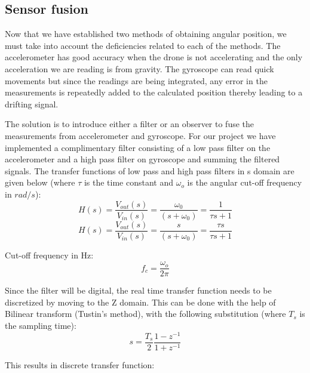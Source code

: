 \subsection{Sensor fusion}
Now that we have established two methods of obtaining angular position, we must take into account the deficiencies related to each of the methods. The accelerometer has good accuracy when the drone is not accelerating and the only acceleration we are reading is from gravity.
The gyroscope can read quick movements but since the readings are being integrated, any error in the measurements is repeatedly added to the calculated position thereby leading to a drifting signal.

The solution is to introduce either a filter or an observer to fuse the measurements from accelerometer and gyroscope. For our project we have implemented a complimentary filter consisting of a low pass filter on the accelerometer and a high pass filter on gyroscope and summing the filtered signals.
\newline
The transfer functions of low pass and high pass filters in s domain are given below (where $\tau$ is the time constant and $\omega _o$ is the angular cut-off frequency in $rad/s$):\newline 
\begin{displaymath}
H(s) = \frac{V_{out}(s)}{V_{in}(s)} = \frac{\omega_0}{(s+\omega_0)}= \frac{1}{\tau s+1}
\end{displaymath}
\begin{displaymath}
H(s) = \frac{V_{out}(s)}{V_{in}(s)} = \frac{s}{(s+\omega_0)}= \frac{\tau s}{\tau s+1}
\end{displaymath}

Cut-off frequency in Hz:
\begin{displaymath}
    f_c=\frac{\omega _o}{2\pi}
\end{displaymath}
\newline

Since the filter will be digital, the real time transfer function needs to be discretized by moving to the Z domain. This can be done with the help of Bilinear transform (Tustin's method), with the following substitution (where $T_s$ is the sampling time):
\begin{displaymath}
    s=\frac{T_s}{2}\frac{1-z^{-1}}{1+z^{-1}}
\end{displaymath}


 This results in discrete transfer function: 



